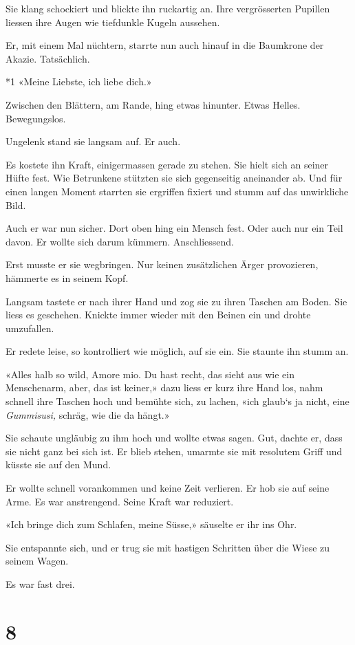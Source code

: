 Sie klang schockiert und blickte ihn ruckartig an. Ihre vergrösserten
Pupillen liessen ihre Augen wie tiefdunkle Kugeln aussehen.

Er, mit einem Mal nüchtern, starrte nun auch hinauf in die Baumkrone der
Akazie. Tatsächlich.

*1 «Meine Liebste, ich liebe dich.»

Zwischen den Blättern, am Rande, hing etwas hinunter. Etwas Helles.
Bewegungslos.

Ungelenk stand sie langsam auf. Er auch.

Es kostete ihn Kraft, einigermassen gerade zu stehen. Sie hielt sich an
seiner Hüfte fest. Wie Betrunkene stützten sie sich gegenseitig
aneinander ab. Und für einen langen Moment starrten sie ergriffen
fixiert und stumm auf das unwirkliche Bild.

Auch er war nun sicher. Dort oben hing ein Mensch fest. Oder auch nur
ein Teil davon. Er wollte sich darum kümmern. Anschliessend.

Erst musste er sie wegbringen. Nur keinen zusätzlichen Ärger
provozieren, hämmerte es in seinem Kopf.

Langsam tastete er nach ihrer Hand und zog sie zu ihren Taschen am
Boden. Sie liess es geschehen. Knickte immer wieder mit den Beinen ein
und drohte umzufallen.

Er redete leise, so kontrolliert wie möglich, auf sie ein. Sie staunte
ihn stumm an.

«Alles halb so wild, Amore mio. Du hast recht, das sieht aus wie ein
Menschenarm, aber, das ist keiner,» dazu liess er kurz ihre Hand los,
nahm schnell ihre Taschen hoch und bemühte sich, zu lachen, «ich glaub`s
ja nicht, eine \emph{Gummisusi,} schräg, wie die da hängt.»

Sie schaute ungläubig zu ihm hoch und wollte etwas sagen. Gut, dachte
er, dass sie nicht ganz bei sich ist. Er blieb stehen, umarmte sie mit
resolutem Griff und küsste sie auf den Mund.

Er wollte schnell vorankommen und keine Zeit verlieren. Er hob sie auf
seine Arme. Es war anstrengend. Seine Kraft war reduziert.

«Ich bringe dich zum Schlafen, meine Süsse,» säuselte er ihr ins Ohr.

Sie entspannte sich, und er trug sie mit hastigen Schritten über die
Wiese zu seinem Wagen.

Es war fast drei.

\chapter{8}\label{section-7}

